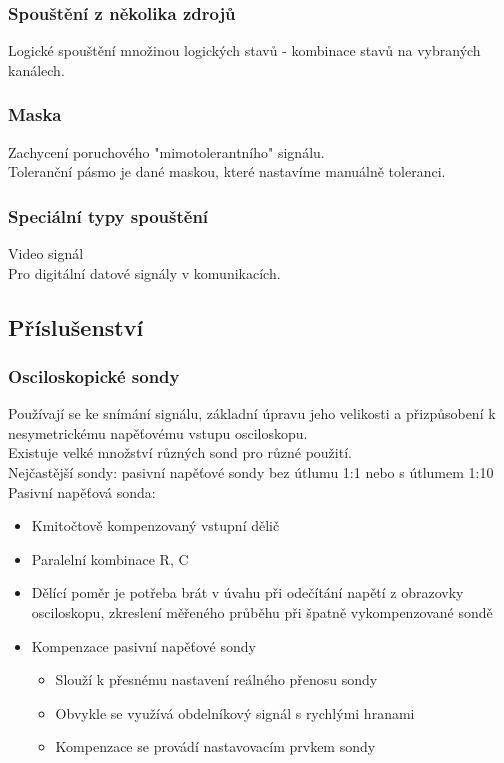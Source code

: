 \subsubsection*{Spouštění z několika zdrojů}
Logické spouštění množinou logických stavů - kombinace stavů na vybraných kanálech.\\

\subsubsection*{Maska}
Zachycení poruchového "mimotolerantního" signálu.\\
Toleranční pásmo je dané maskou, které nastavíme manuálně toleranci.\\

\subsubsection*{Speciální typy spouštění}
Video signál\\
Pro digitální datové signály v komunikacích.\\

\subsection*{Příslušenství}
\subsubsection*{Osciloskopické sondy}
Používají se ke snímání signálu, základní úpravu jeho velikosti a přizpůsobení k nesymetrickému napěťovému vstupu osciloskopu. \\
Existuje velké množství různých sond pro různé použití.\\
Nejčastější sondy: pasivní napěťové sondy bez útlumu 1:1 nebo s útlumem 1:10\\
Pasivní napěťová sonda:
\begin{itemize}
    \item Kmitočtově kompenzovaný vstupní dělič 
    \item Paralelní kombinace R, C 
    \item Dělící poměr je potřeba brát v úvahu při odečítání napětí z obrazovky osciloskopu, zkreslení měřeného průběhu při špatně vykompenzované sondě
    \item Kompenzace pasivní napěťové sondy
    \begin{itemize}
        \item Slouží k přesnému nastavení reálného přenosu sondy 
        \item Obvykle se využívá obdelníkový signál s rychlými hranami
        \item Kompenzace se provádí nastavovacím prvkem sondy
    \end{itemize}
\end{itemize}

